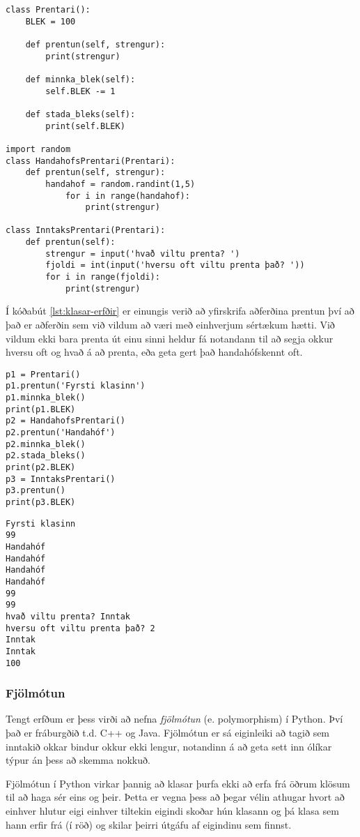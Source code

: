 \begin{lstlisting}[caption=Erfðir kynntar með klasanum Prentari, label=lst:klasar-erfðir]
class Prentari():
	BLEK = 100
	
	def prentun(self, strengur):
		print(strengur)
	
	def minnka_blek(self):
		self.BLEK -= 1
	
	def stada_bleks(self):
		print(self.BLEK)
		
import random
class HandahofsPrentari(Prentari):
	def prentun(self, strengur):
		handahof = random.randint(1,5)
			for i in range(handahof):
				print(strengur)

class InntaksPrentari(Prentari):
	def prentun(self):
		strengur = input('hvað viltu prenta? ')
		fjoldi = int(input('hversu oft viltu prenta það? '))
		for i in range(fjoldi):
			print(strengur)
\end{lstlisting}

Í kóðabút \ref{lst:klasar-erfðir} er einungis verið að yfirskrifa aðferðina prentun því að það er aðferðin sem við vildum að væri með einhverjum sértækum hætti.
Við vildum ekki bara prenta út einu sinni heldur fá notandann til að segja okkur hversu oft og hvað á að prenta, eða geta gert það handahófskennt oft.

\begin{lstlisting}[caption=Prentaraklasarnir notaðir, label=lst:klasar-erfðir-2]
p1 = Prentari()
p1.prentun('Fyrsti klasinn')
p1.minnka_blek()
print(p1.BLEK)
p2 = HandahofsPrentari()
p2.prentun('Handahóf')
p2.minnka_blek()
p2.stada_bleks()
print(p2.BLEK)
p3 = InntaksPrentari()
p3.prentun()
print(p3.BLEK)
\end{lstlisting}
\lstset{style=uttak}
\begin{lstlisting}
Fyrsti klasinn
99
Handahóf
Handahóf
Handahóf
Handahóf
99
99
hvað viltu prenta? Inntak
hversu oft viltu prenta það? 2
Inntak
Inntak
100
\end{lstlisting}
\lstset{style=venjulegt}


\subsubsection{Fjölmótun}
Tengt erfðum er þess virði að nefna \emph{fjölmótun} (e. polymorphism) í Python.
Því það er fráburgðið t.d. C++ og Java.
Fjölmótun er sá eiginleiki að tagið sem inntakið okkar bindur okkur ekki lengur, notandinn á að geta sett inn ólíkar týpur án þess að skemma nokkuð.

Fjölmótun í Python virkar þannig að klasar þurfa ekki að erfa frá öðrum klösum til að haga sér eins og þeir.
Þetta er vegna þess að þegar vélin athugar hvort að einhver hlutur eigi einhver tiltekin eigindi skoðar hún klasann og þá klasa sem hann erfir frá (í röð) og skilar þeirri útgáfu af eigindinu sem finnst.

